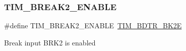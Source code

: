 \subsubsection{\texorpdfstring{TIM\_BREAK2\_ENABLE}{TIM\_BREAK2\_ENABLE}}
{\footnotesize\ttfamily \#define T\+I\+M\+\_\+\+B\+R\+E\+A\+K2\+\_\+\+E\+N\+A\+B\+LE~\mbox{\hyperlink{group___peripheral___registers___bits___definition_ga50aff10d1577a94de8c4aa46cd2cbdb5}{T\+I\+M\+\_\+\+B\+D\+T\+R\+\_\+\+B\+K2E}}}

Break input B\+R\+K2 is enabled 